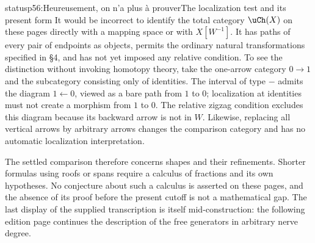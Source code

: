 \begin{dcomment}{status}{p56:Heureusement, on n'a plus à prouver}{The localization test and its present form}
It would be incorrect to identify the total category $\uCh(X)$ on these pages directly with a mapping space or with $X[W^{-1}]$. It has paths of every pair of endpoints as objects, permits the ordinary natural transformations specified in \S4, and has not yet imposed any relative condition. To see the distinction without invoking homotopy theory, take the one-arrow category $0\to1$ and the subcategory consisting only of identities. The interval of type $-$ admits the diagram $1\leftarrow0$, viewed as a bare path from $1$ to $0$; localization at identities must not create a morphism from $1$ to $0$. The relative zigzag condition excludes this diagram because its backward arrow is not in $W$. Likewise, replacing all vertical arrows by arbitrary arrows changes the comparison category and has no automatic localization interpretation.

The settled comparison therefore concerns shapes and their refinements. Shorter formulas using roofs or spans require a calculus of fractions and its own hypotheses. No conjecture about such a calculus is asserted on these pages, and the absence of its proof before the present cutoff is not a mathematical gap. The last display of the supplied transcription is itself mid-construction: the following edition page continues the description of the free generators in arbitrary nerve degree.
\end{dcomment}

